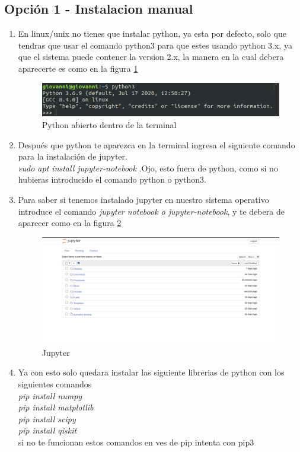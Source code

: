 \documentclass[12pt,letterpaper]{report}
\begin{document}
\subsection*{Opci\'on 1 - Instalacion manual}
\begin{enumerate}
    \item En linux/unix no tienes que instalar python, ya esta por defecto, solo que tendras que usar el comando python3 para que estes usando python 3.x, ya que el sistema puede contener la version 2.x, la manera en la cual debera aparecerte es como en la figura \ref{python-terminal2}
    \begin{figure}[H]
        \includegraphics[scale=0.7]{images/python-print.png}
        \caption{Python abierto dentro de la terminal}
        \label{python-terminal2}
    \end{figure}
    \item Despu\'es que python te aparezca en la terminal ingresa el siguiente comando para la instalaci\'on de jupyter.\\
    \textit{sudo apt install jupyter-notebook} .Ojo, esto fuera de python, como si no hubieras introducido el comando python o python3.
    \item Para saber si tenemos instalado jupyter en nuestro sistema operativo introduce el comando \textit{jupyter notebook o jupyter-notebook}, y te debera de aparecer como en la figura \ref{jupyter-linux}
    \begin{figure}[H]
        \includegraphics[scale=0.3]{images/jupyter.png}
        \caption{Jupyter}
        \label{jupyter-linux}
    \end{figure}
    \item Ya con esto solo quedara instalar las siguiente librerias de python con los siguientes comandos\\
    \textit{pip install numpy\\
    pip install matplotlib\\
    pip install scipy\\
    pip install qiskit\\}
    si no te funcionan estos comandos en ves de pip intenta con pip3
\end{enumerate}
\end{document}
